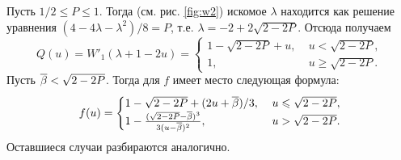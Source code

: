 {\begin{example}
  Пусть $1/2 \leqslant P \leqslant 1$.
  Тогда (см. рис. \ref{fig:w2}) искомое $\lambda$ находится как решение уравнения $(4 - 4\lambda - \lambda^2)/8 = P$, т.е. $\lambda = -2 + 2\sqrt{2 - 2P}$.
  Отсюда получаем
  \begin{equation*}
    Q(u) = W'_1(\lambda + 1 - 2u) = \begin{cases}
      1 - \sqrt{2 - 2P} + u, &\; u < \sqrt{2 - 2P},\\
      1, &\; u \geqslant \sqrt{2 - 2P}.
    \end{cases}
  \end{equation*}
  Пусть ${\overline{\beta}} < \sqrt{2 - 2P}$.
  Тогда для $f$ имеет место следующая формула:
  \begin{equation*}
    f(u) = \begin{cases}
      1 - \sqrt{2 - 2P} + (2u + {\overline{\beta}})/3, &\; u \leqslant \sqrt{2 - 2P},\\
      1 - \frac{(\sqrt{2 - 2P} - {\overline{\beta}})^3}{3(u - {\overline{\beta}})^2}, &\; u > \sqrt{2 - 2P}.
    \end{cases}
  \end{equation*}
  Оставшиеся случаи разбираются аналогично.
\end{example}

}
